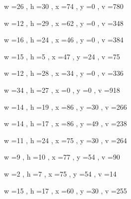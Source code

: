 \documentclass[11pt]{article}
\begin{document}
w =26 , h =30 , x =74 , y =0 , v =780
\par
w =12 , h =29 , x =62 , y =0 , v =348
\par
w =16 , h =24 , x =46 , y =0 , v =384
\par
w =15 , h =5 , x =47 , y =24 , v =75
\par
w =12 , h =28 , x =34 , y =0 , v =336
\par
w =34 , h =27 , x =0 , y =0 , v =918
\par
w =14 , h =19 , x =86 , y =30 , v =266
\par
w =14 , h =17 , x =86 , y =49 , v =238
\par
w =11 , h =24 , x =75 , y =30 , v =264
\par
w =9 , h =10 , x =77 , y =54 , v =90
\par
w =2 , h =7 , x =75 , y =54 , v =14
\par
w =15 , h =17 , x =60 , y =30 , v =255
\par
\newpage
\end{document}
